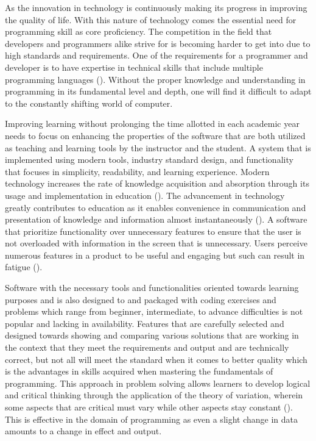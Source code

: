 \justifying
\parx
As the innovation in technology is continuously making its progress in improving
the quality of life. With this nature of technology comes the essential need for
programming skill as core proficiency. The competition in the field that
developers and programmers alike strive for is becoming harder to get into due
to high standards and requirements. One of the requirements for a programmer and
developer is to have expertise in technical skills that include multiple
programming languages (\cite{tsai_yang_chang_2015}). Without the proper
knowledge and understanding in programming in its fundamental level and depth,
one will find it difficult to adapt to the constantly shifting world of
computer.

\parx
Improving learning without prolonging the time allotted in each
academic year needs to focus on enhancing the properties of the software that
are both utilized as teaching and learning tools by the instructor and the
student. A system that is implemented using modern tools, industry
standard design, and functionality that focuses in simplicity, readability, and
learning experience. Modern technology increases the rate of knowledge
acquisition and absorption through its usage and implementation in education
(\cite{raja_nagasubramani_2018}). The advancement in technology greatly
contributes to education as it enables convenience in communication and
presentation of knowledge and information almost instantaneously
(\cite{anggrawan_ibrahim_m}). A software that prioritize functionality over
unnecessary features to ensure that the user is not overloaded with information
in the screen that is unnecessary. Users perceive numerous features in a product
to be useful and engaging but such can result in fatigue
(\cite{thompson_hamilton_rust_2005}).

\parx
Software with the necessary tools and functionalities oriented towards learning
purposes and is also designed to and packaged with coding exercises and problems
which range from beginner, intermediate, to advance difficulties is not popular
and lacking in availability. Features that are carefully selected and designed
towards showing and comparing various solutions that are working in the context
that they meet the requirements and output and are technically correct, but not
all will meet the standard when it comes to better quality which is the
advantages in skills acquired when mastering the fundamentals of programming.
This approach in problem solving allows learners to develop logical and critical
thinking through the application of the theory of variation, wherein some
aspects that are critical must vary while other aspects stay constant
(\cite{cheng_2016}). This is effective in the domain of programming as even a
slight change in data amounts to a change in effect and output.

